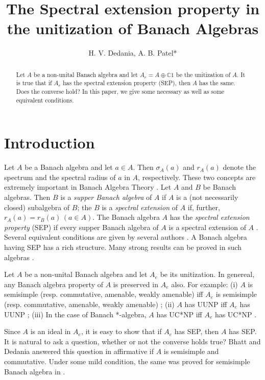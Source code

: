 \documentclass{amsart}
\title[Spectral extension property]{The Spectral extension property in the unitization of Banach Algebras}
\author{H. V. Dedania, A. B. Patel*}
\theoremstyle{plain}
\numberwithin{equation}{section}
\begin{document}


\begin{abstract}
Let $A$ be a non-unital Banach algebra and let $A_e = A \oplus {\mathbb C}1$ be the unitization of $A$. It is true that if $A_e$ has the spectral extension property (SEP), then $A$ has the same. Does the converse hold? In this paper, we give some necessary as well as some equivalent conditions.
\end{abstract}
\maketitle

\section{Introduction}

Let $A$ be a Banach algebra and let $a \in A$. Then $\sigma_A(a)$ and $r_A(a)$ denote the spectrum and the spectral radius of $a$ in $A$, respectively. These two concepts are extremely important in Banach Algebra Theory \cite[Section 5]{BoDu:73}. Let $A$ and $B$ be Banach algebras. Then $B$ is a \emph{supper Banach algebra} of $A$ if $A$ is a (not necessarily closed) subalgebra of $B$; the $B$ is a \emph{spectral extension} of $A$ if, further, $r_A(a) = r_B(a) \, (a \in A)$. The Banach algebra $A$ has the \emph{spectral extension property} (SEP) if every supper Banach algebra of $A$ is a spectral extension of $A$ \cite{Me:91}. Several equivalent conditions are given by several authors \cite{ToYo:89, BhDe:96}. A Banach algebra having SEP has a rich structure. Many strong results can be proved in such algebras \cite{Me:92}.

Let $A$ be a non-unital Banach algebra and let $A_e$ be its unitization. In genereal, any Banach algebra property of $A$ is preserved in $A_e$ also. For example: (i) $A$ is semisimple (resp. commutative, amenable, weakly amenable) iff $A_e$ is semisimple (resp. commutative, amenable, weakly amenable) \cite[Section 2.8]{Da:00}; (ii) $A$ has UUNP iff $A_e$ has UUNP \cite{DaDe:09}; (iii) In the case of Banach *-algebra, $A$ has UC*NP iff $A_e$ has UC*NP \cite{DeKa:13}.

Since $A$ is an ideal in $A_e$, it is easy to show that if $A_e$ has SEP, then $A$ has SEP. It is natural to ask a question, whether or not the converse holds true? Bhatt and Dedania answered this question in affirmative if $A$ is semisimple and commutative. Under some mild condition, the same was proved for semisimple Banach algebra in \cite{DeKa:13}.
\end{document}
